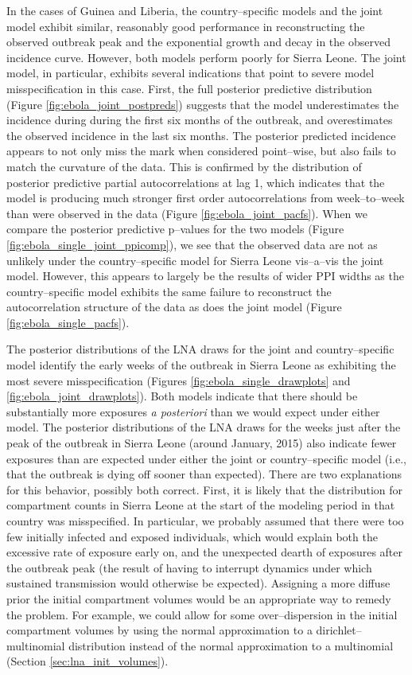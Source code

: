 In the cases of Guinea and Liberia, the country--specific models and the joint model exhibit similar, reasonably good performance in reconstructing the observed outbreak peak and the exponential growth and decay in the observed incidence curve. However, both models perform poorly for Sierra Leone. The joint model, in particular, exhibits several indications that point to severe model misspecification in this case.  First, the full posterior predictive distribution (Figure \ref{fig:ebola_joint_postpreds}) suggests that the model underestimates the incidence during during the first six months of the outbreak, and overestimates the observed incidence in the last six months. The posterior predicted incidence appears to not only miss the mark when considered point--wise, but also fails to match the curvature of the data. This is confirmed by the distribution of posterior predictive partial autocorrelations at lag 1, which indicates that the model is producing much stronger first order autocorrelations from week--to--week than were observed in the data (Figure \ref{fig:ebola_joint_pacfs}). When we compare the posterior predictive p--values for the two models (Figure \ref{fig:ebola_single_joint_ppicomp}), we see that the observed data are not as unlikely under the country--specific model for Sierra Leone vis--a--vis the joint model. However, this appears to largely be the results of wider PPI widths as the country--specific model exhibits the same failure to reconstruct the autocorrelation structure of the data as does the joint model (Figure \ref{fig:ebola_single_pacfs}). 

The posterior distributions of the LNA draws for the joint and country--specific model identify the early weeks of the outbreak in Sierra Leone as exhibiting the most severe misspecification (Figures \ref{fig:ebola_single_drawplots} and \ref{fig:ebola_joint_drawplots}). Both models indicate that there should be substantially more exposures \textit{a posteriori} than we would expect under either model. The posterior distributions of the LNA draws for the weeks just after the peak of the outbreak in Sierra Leone (around January, 2015) also indicate fewer exposures than are expected under either the joint or country--specific model (i.e., that the outbreak is dying off sooner than expected). There are two explanations for this behavior, possibly both correct. First, it is likely that the distribution for compartment counts in Sierra Leone at the start of the modeling period in that country was misspecified. In particular, we probably assumed that there were too few initially infected and exposed individuals, which would explain both the excessive rate of exposure early on, and the unexpected dearth of exposures after the outbreak peak (the result of having to interrupt dynamics under which sustained transmission would otherwise be expected). Assigning a more diffuse prior the initial compartment volumes would be an appropriate way to remedy the problem. For example, we could allow for some over--dispersion in the initial compartment volumes by using the normal approximation to a dirichlet--multinomial distribution instead of the normal approximation to a multinomial (Section \ref{sec:lna_init_volumes}). 

